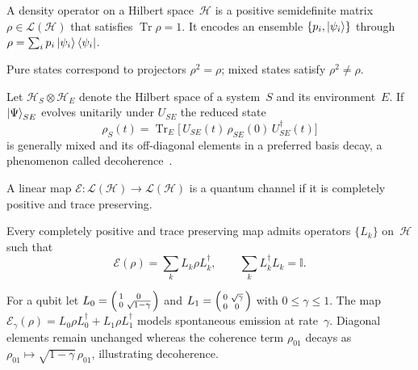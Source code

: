 \begin{definition}\label{def:density}
	A density operator on a Hilbert space~$\mathcal H$ is a positive semidefinite matrix $\rho\in\mathcal L(\mathcal H)$ that satisfies $\operatorname{Tr}\rho=1$.  
	It encodes an ensemble $\{p_{i},\ket{\psi_{i}}\}$ through $\rho=\sum_{i}p_{i}\ket{\psi_{i}}\bra{\psi_{i}}$.
\end{definition}

Pure states correspond to projectors $\rho^{2}=\rho$; mixed states satisfy $\rho^{2}\neq\rho$.


Let $\mathcal H_{S}\otimes\mathcal H_{E}$ denote the Hilbert space of a system~$S$ and its environment~$E$.  
If $\ket{\Psi}_{SE}$ evolves unitarily under $U_{SE}$ the reduced state
\[
	\rho_{S}(t)=\operatorname{Tr}_{E}\bigl[\,U_{SE}(t)\,\rho_{SE}(0)\,U_{SE}^{\dagger}(t)\bigr]
\]
is generally mixed and its off-diagonal elements in a preferred basis decay, a phenomenon called decoherence~\cite{zurek2003decoherence,schlosshauer2004decoherence}.  

\begin{definition}\label{def:channel}
	A linear map $\mathcal E:\mathcal L(\mathcal H)\to\mathcal L(\mathcal H)$ is a quantum channel if it is completely positive and trace preserving.
\end{definition}

\begin{proposition}\label{prop:kraus}
	Every completely positive and trace preserving map admits operators $\{L_{k}\}$ on~$\mathcal H$ such that
	\[
		\mathcal E(\rho)=\sum_{k}L_{k}\rho L_{k}^{\dagger},
		\qquad
		\sum_{k}L_{k}^{\dagger}L_{k}=\mathbb I .
	\]
\end{proposition}

\begin{example}\label{ex:amplitude_damp}
	For a qubit let $L_{0}=\begin{psmallmatrix}1&0\\0&\sqrt{1-\gamma}\end{psmallmatrix}$ and
	$L_{1}=\begin{psmallmatrix}0&\sqrt{\gamma}\\0&0\end{psmallmatrix}$ with $0\le\gamma\le1$.  
	The map $\mathcal E_{\gamma}(\rho)=L_{0}\rho L_{0}^{\dagger}+L_{1}\rho L_{1}^{\dagger}$ models spontaneous emission at rate~$\gamma$.  
	Diagonal elements remain unchanged whereas the coherence term $\rho_{01}$ decays as $\rho_{01}\mapsto\sqrt{1-\gamma}\,\rho_{01}$, illustrating decoherence.
\end{example}


